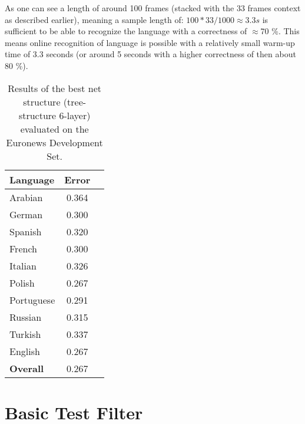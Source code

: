As one can see a length of around 100 frames (stacked with the 33 frames context as described earlier), meaning a sample length of: \(100*33 / 1000 \approx 3.3s \) is sufficient to be able to recognize the language with a correctness of \(\approx\)70 \%. This means online recognition of language is possible with a relatively small warm-up time of 3.3 seconds (or around 5 seconds with a higher correctness of then about 80 \%).
\begin{figure}
\label{fig:lengthBasic}
\end{figure}
\begin{table}[h!]
\label{tab:bareResults}
\centering
\begin{tabular}{| l | c | r | }
	\hline
	\textbf{Language} & \textbf{Error}  \\
	\hline
	Arabian & 0.364  \\
	German & 0.300  \\
	Spanish & 0.320 \\ 
	French & 0.300 \\
	Italian & 0.326  \\
	Polish & 0.267 \\
	Portuguese& 0.291  \\
	Russian&  0.315 \\
	Turkish&  0.337 \\
	English&  0.267 \\
	\hline
	\textbf{Overall} & 0.267 \\
	\hline
\end{tabular}
\caption{Results of the best net structure (tree-structure 6-layer) evaluated on the Euronews Development Set.}
\end{table}


\section{Basic Test Filter}
\label{sec:eval:basic}

